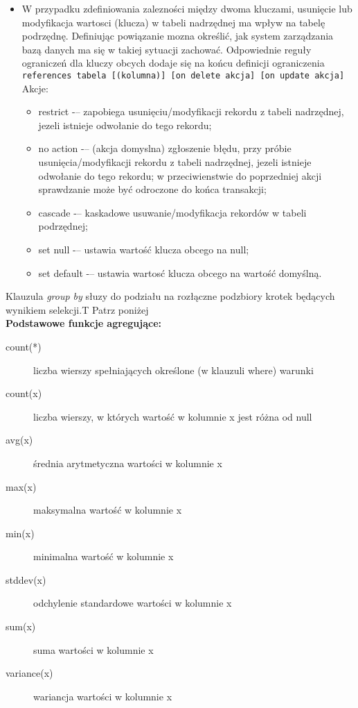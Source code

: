 \begin{itemize}
	\item W przypadku zdefiniowania zalezności między dwoma kluczami, usunięcie lub modyfikacja wartosci (klucza) w tabeli nadrzędnej ma wpływ na tabelę podrzędnę.
Definiując powiązanie mozna określić, jak system zarządzania bazą danych ma się w takiej sytuacji zachować. Odpowiednie reguły ograniczeń dla kluczy obcych dodaje się
na końcu definicji ograniczenia\\
\lstinline[columns=fixed]{references tabela [(kolumna)] [on delete akcja] [on update akcja]}\\ 

Akcje:
\begin{itemize}
	\item restrict -– zapobiega usunięciu/modyfikacji rekordu z tabeli nadrzędnej, jezeli istnieje odwołanie do tego rekordu;
	\item no action -– (akcja domyslna) zgłoszenie błędu, przy próbie usunięcia/modyfikacji rekordu z tabeli nadrzędnej, jezeli istnieje odwołanie do tego rekordu; w przeciwienstwie do poprzedniej akcji sprawdzanie może być odroczone do końca transakcji;
	\item cascade -– kaskadowe usuwanie/modyfikacja rekordów w tabeli podrzędnej;
	\item set null -– ustawia wartość klucza obcego na null;
	\item set default -– ustawia wartosć klucza obcego na wartość domyślną.
\end{itemize}
\end{itemize}


{Klauzula \textit{group by} słuzy do podziału na rozłączne podzbiory krotek będących wynikiem selekcji.}{T}
{Patrz poniżej}{\\}
\noindent
\textbf{Podstawowe funkcje agregujące:}
\begin{description}
   \item[count(*)] liczba wierszy spełniających określone (w klauzuli where) warunki 
   \item[count(x)] liczba wierszy, w których wartość w kolumnie x jest różna od null
   \item[avg(x)] średnia arytmetyczna wartości w kolumnie x
   \item[max(x)] maksymalna wartość w kolumnie x
   \item[min(x)] minimalna wartość w kolumnie x
   \item[stddev(x)] odchylenie standardowe wartości w kolumnie x
   \item[sum(x)] suma wartości w kolumnie x
   \item[variance(x)] wariancja wartości w kolumnie x
\end{description}

